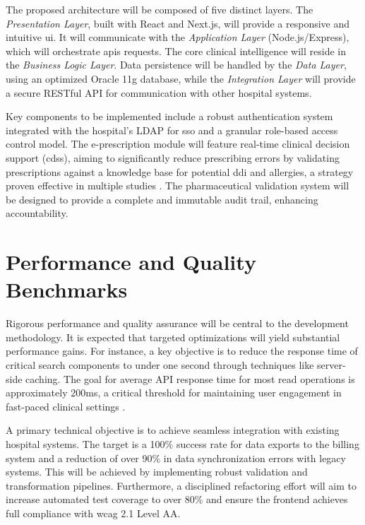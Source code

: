 The proposed architecture will be composed of five distinct layers. The \textit{Presentation Layer}, built with React and Next.js, will provide a responsive and intuitive \gls{ui}. It will communicate with the \textit{Application Layer} (Node.js/Express), which will orchestrate \glspl{api} requests. The core clinical intelligence will reside in the \textit{Business Logic Layer}. Data persistence will be handled by the \textit{Data Layer}, using an optimized Oracle 11g database, while the \textit{Integration Layer} will provide a secure RESTful API for communication with other hospital systems.

Key components to be implemented include a robust authentication system integrated with the hospital's LDAP for \gls{sso} and a granular role-based access control model. The e-prescription module will feature real-time clinical decision support (\gls{cdss}), aiming to significantly reduce prescribing errors by validating prescriptions against a knowledge base for potential \gls{ddi} and allergies, a strategy proven effective in multiple studies \cite{bates2014}. The pharmaceutical validation system will be designed to provide a complete and immutable audit trail, enhancing accountability.

\section{Performance and Quality Benchmarks}

Rigorous performance and quality assurance will be central to the development methodology. It is expected that targeted optimizations will yield substantial performance gains. For instance, a key objective is to reduce the response time of critical search components to under one second through techniques like server-side caching. The goal for average API response time for most read operations is approximately 200ms, a critical threshold for maintaining user engagement in fast-paced clinical settings \cite{nielsen2012}.

A primary technical objective is to achieve seamless integration with existing hospital systems. The target is a 100\% success rate for data exports to the billing system and a reduction of over 90\% in data synchronization errors with legacy systems. This will be achieved by implementing robust validation and transformation pipelines. Furthermore, a disciplined refactoring effort will aim to increase automated test coverage to over 80\% and ensure the frontend achieves full compliance with \gls{wcag} 2.1 Level AA.

